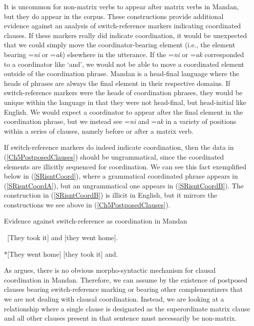 It is uncommon for non-matrix verbs to appear after matrix verbs in Mandan, but they do appear in the corpus. These constructions provide additional evidence against an analysis of switch-reference markers indicating coordinated clauses. If these markers really did indicate coordination, it would be unexpected that we could simply move the coordinator-bearing element (i.e., the element bearing =\textit{ni} or =\textit{ak}) elsewhere in the utterance. If the =\textit{ni} or =\textit{ak} corresponded to a coordinator like `and', we would not be able to move a coordinated element outside of the coordination phrase. Mandan is a head-final language where the heads of phrases are always the final element in their respective domains. If switch-reference markers were the heads of coordination phrases, they would be unique within the language in that they were not head-final, but head-initial like English. We would expect a coordinator to appear after the final element in the coordination phrase, but we instead see =\textit{ni} and =\textit{ak} in a variety of positions within a series of clauses, namely before or after a matrix verb.

If switch-reference markers do indeed indicate coordination, then the data in 
(\ref{Ch5PostposedClauses}) should be ungrammatical, since the coordinated elements are illicitly sequenced for coordination. We can see this fact exemplified below in (\ref{SRisntCoord}), where a grammatical coordinated phrase appears in (\ref{SRisntCoordA}), but an ungrammatical one appears in (\ref{SRisntCoordB}). The construction in (\ref{SRisntCoordB}) is illicit in English, but it mirrors the constructions we see above in (\ref{Ch5PostposedClauses}).

\begin{exe}
    \item\label{SRisntCoord} Evidence against switch-reference as coordination in Mandan

    \begin{xlist}
    \item\label{SRisntCoordA} {~[}They took it] and [they went home].
    \item\label{SRisntCoordB} *[They went home] {[}they took it] and.
    \end{xlist}
\end{exe}

As  argues, there is no obvious morpho-syntactic mechanism for clausal coordination in Mandan. Therefore, we can assume by the existence of postposed clauses bearing switch-reference marking or bearing other complementizers that we are not dealing with clausal coordination. Instead, we are looking at a relationship where a single clause is designated as the superordinate matrix clause and all other clauses present in that sentence must necessarily be non-matrix.

